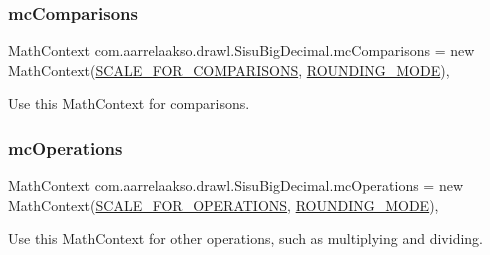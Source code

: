\subsubsection{\texorpdfstring{mc\+Comparisons}{mcComparisons}}
{\footnotesize\ttfamily Math\+Context com.\+aarrelaakso.\+drawl.\+Sisu\+Big\+Decimal.\+mc\+Comparisons = new Math\+Context(\hyperlink{classcom_1_1aarrelaakso_1_1drawl_1_1_sisu_big_decimal_a5d8592149ed329cfd2f80ec81e790a9e}{S\+C\+A\+L\+E\+\_\+\+F\+O\+R\+\_\+\+C\+O\+M\+P\+A\+R\+I\+S\+O\+NS}, \hyperlink{classcom_1_1aarrelaakso_1_1drawl_1_1_sisu_big_decimal_afcdca984f764db570786fff2442142cb}{R\+O\+U\+N\+D\+I\+N\+G\+\_\+\+M\+O\+DE})\hspace{0.3cm}{\ttfamily [static]}, {\ttfamily [protected]}}



Use this Math\+Context for comparisons. 

\mbox{\label{classcom_1_1aarrelaakso_1_1drawl_1_1_sisu_big_decimal_a7986e3e83f8b0c7b5a3784757ffc5d1d}} 
\subsubsection{\texorpdfstring{mc\+Operations}{mcOperations}}
{\footnotesize\ttfamily Math\+Context com.\+aarrelaakso.\+drawl.\+Sisu\+Big\+Decimal.\+mc\+Operations = new Math\+Context(\hyperlink{classcom_1_1aarrelaakso_1_1drawl_1_1_sisu_big_decimal_a5dfdeb68abdc4865a00b27136c6e8c54}{S\+C\+A\+L\+E\+\_\+\+F\+O\+R\+\_\+\+O\+P\+E\+R\+A\+T\+I\+O\+NS}, \hyperlink{classcom_1_1aarrelaakso_1_1drawl_1_1_sisu_big_decimal_afcdca984f764db570786fff2442142cb}{R\+O\+U\+N\+D\+I\+N\+G\+\_\+\+M\+O\+DE})\hspace{0.3cm}{\ttfamily [static]}, {\ttfamily [protected]}}



Use this Math\+Context for other operations, such as multiplying and dividing. 

\mbox{\label{classcom_1_1aarrelaakso_1_1drawl_1_1_sisu_big_decimal_af27e00f82037e4c3658558cd6c81af06}} 
